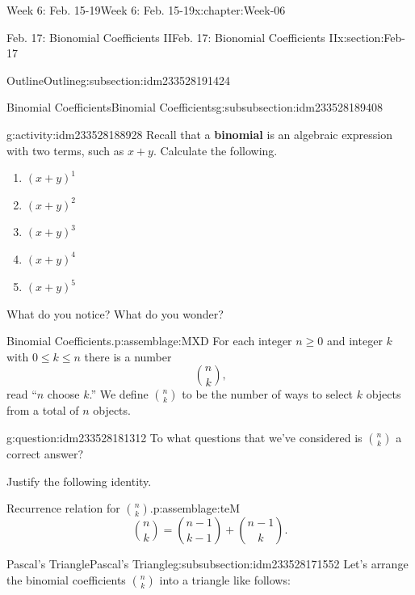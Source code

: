 \documentclass[oneside,10pt,]{book}
\newcommand{\terminology}[1]{\textbf{#1}}
\numberwithin{equation}{section}
\renewcommand{\le}{\leqslant}
\renewcommand{\ge}{\geqslant}
\begin{document}
\begin{chapterptx}{Week 6: Feb. 15-19}{}{Week 6: Feb. 15-19}{}{}{x:chapter:Week-06}
\begin{sectionptx}{Feb. 17: Bionomial Coefficients II}{}{Feb. 17: Bionomial Coefficients II}{}{}{x:section:Feb-17}
\begin{subsectionptx}{Outline}{}{Outline}{}{}{g:subsection:idm233528191424}
\begin{subsubsectionptx}{Binomial Coefficients}{}{Binomial Coefficients}{}{}{g:subsubsection:idm233528189408}
\begin{activity}{}{g:activity:idm233528188928}%
Recall that a \terminology{binomial} is an algebraic expression with two terms, such as \(x+y\). Calculate the following.%
%
\begin{enumerate}
\item{}\(\displaystyle (x+y)^1\)%
\item{}\(\displaystyle (x+y)^2\)%
\item{}\(\displaystyle (x+y)^3\)%
\item{}\(\displaystyle (x+y)^4\)%
\item{}\(\displaystyle (x+y)^5\)%
\end{enumerate}
What do you notice? What do you wonder?%
\end{activity}%
\begin{assemblage}{Binomial Coefficients.}{p:assemblage:MXD}%
For each integer \(n \ge 0\) and integer \(k\) with \(0 \le k \le n\) there is a number%
\begin{equation*}
{n\choose k}\text{,}
\end{equation*}
read ``\(n\) choose \(k\).'' We define \({n \choose k}\) to be the number of ways to select \(k\) objects from a total of \(n\) objects.%
\end{assemblage}
\begin{question}{}{g:question:idm233528181312}%
To what questions that we've considered is \(\binom{n}{k}\) a correct answer?%
\end{question}
Justify the following identity.%
\begin{assemblage}{Recurrence relation for \({n \choose k}\).}{p:assemblage:teM}%
%
\begin{equation*}
{n \choose k} = {n-1 \choose k-1} + {n-1 \choose k}\text{.}
\end{equation*}
%
\end{assemblage}
\end{subsubsectionptx}
%
%
\typeout{************************************************}
\typeout{************************************************}
%
\begin{subsubsectionptx}{Pascal's Triangle}{}{Pascal's Triangle}{}{}{g:subsubsection:idm233528171552}
Let's arrange the binomial coefficients \({n \choose k}\) into a triangle like follows:%
\begin{sidebyside}{1}{0.15}{0.15}{0}%
\begin{sbspanel}{0.7}%

\end{sbspanel}
\end{sidebyside}
\end{subsubsectionptx}
\end{subsectionptx}
\end{sectionptx}
\end{chapterptx}
\end{document}
